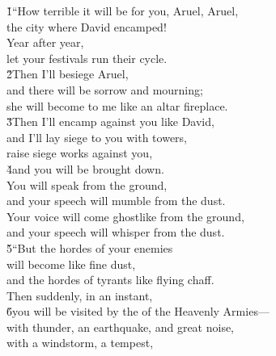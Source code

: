 \begin{poetry}
\poeml {}
\v{1}``How terrible it will be for you, Aruel, Aruel, \\
\poemll    the city where David encamped! \\
\poeml Year after year, \\
\poemll    let your festivals run their cycle. \\
\poeml \v{2}Then I'll besiege Aruel, \\
\poemll    and there will be sorrow and mourning; \\
\poemlll       she will become to me like an altar fireplace. \\
\poeml \v{3}Then I'll encamp against you like David, \\
\poemll    and I'll lay siege to you with towers, \\
\poeml raise siege works against you, \\
\poeml \v{4}and you will be brought down. \\
\poeml You will speak from the ground, \\
\poemll    and your speech will mumble from the dust. \\
\poeml Your voice will come ghostlike from the ground, \\
\poemll    and your speech will whisper from the dust. \\
\poeml \v{5}``But the hordes of your enemies \\
\poemll    will become like fine dust, \\
\poemlll       and the hordes of tyrants like flying chaff. \\
\poeml Then suddenly, in an instant, \\
\poeml \v{6}you will be visited by the  of the Heavenly Armies--- \\
\poeml with thunder, an earthquake, and great noise, \\
\poemll    with a windstorm, a tempest, \\

\end{poetry}
